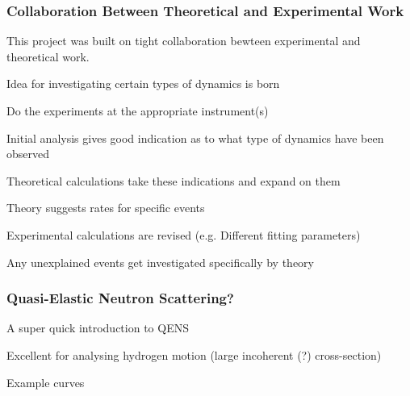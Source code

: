 \subsubsection{Collaboration Between Theoretical and Experimental Work}
\label{sec:cooperation}

This project was built on tight collaboration bewteen experimental and theoretical work.
\ben
\item Idea for investigating certain types of dynamics is born
\item Do the experiments at the appropriate instrument(s)
\item Initial analysis gives good indication as to what type of dynamics have been observed
\item Theoretical calculations take these indications and expand on them
\item Theory suggests rates for specific events
\item Experimental calculations are revised (e.g. Different fitting parameters)
\item Any unexplained events get investigated specifically by theory
\een

\placeholder

\subsubsection{Quasi-Elastic Neutron Scattering?}
\label{sec:qens}
\bit
\item A super quick introduction to QENS
\item Excellent for analysing hydrogen motion (large incoherent (?) cross-section)
\item Example curves
\eit


\placeholder
